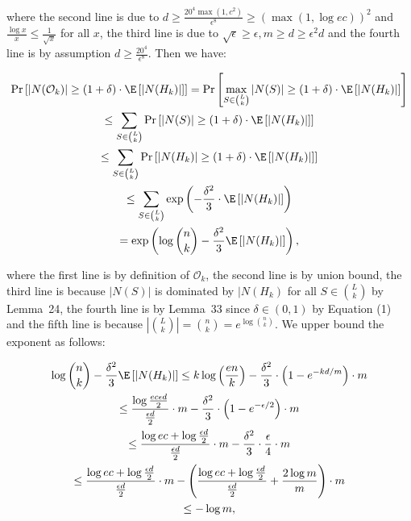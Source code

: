 where the second line is due to $d\geq\frac{20^{4}\max(1,c^{2})}{\epsilon^{8}}\geq(\max(1,\log{ec}))^{2}$ and $\frac{\log{x}}{x}\leq\frac{1}{\sqrt{x}}$ for all $x$, the third line is due to $\sqrt{\epsilon}\geq\epsilon,m\geq d\geq\epsilon^{2}d$ and the fourth line is by assumption $d\geq\frac{20^{4}}{\epsilon^{8}}$.
Then we have:\par


\[\begin{gathered}
\displaystyle\Pr\left[|N(\mathcal{O}_{k})|\geq(1+\delta)\cdot\E\left[|N(H_{k})|\right]\right] \displaystyle=\Pr\left[\max_{S\in\binom{L}{k}}|N(S)|\geq(1+\delta)\cdot\E\left[|N(H_{k})|\right]\right] \\
\displaystyle\leq\sum_{S\in\binom{L}{k}}\Pr\left[|N(S)|\geq(1+\delta)\cdot\E\left[|N(H_{k})|\right]\right] \\
\displaystyle\leq\sum_{S\in\binom{L}{k}}\Pr\left[|N(H_{k})|\geq(1+\delta)\cdot\E\left[|N(H_{k})|\right]\right] \\
\displaystyle\leq\sum_{S\in\binom{L}{k}}\exp\left(-\frac{\delta^{2}}{3}\cdot\E\left[|N(H_{k})|\right]\right) \\
\displaystyle=\exp\left(\log{\binom{n}{k}}-\frac{\delta^{2}}{3}\E\left[|N(H_{k})|\right]\right),
\end{gathered}\]


where the first line is by definition of $\mathcal{O}_{k}$, the second line is by union bound, the third line is because $|N(S)|$ is dominated by $|N(H_{k})$ for all $S\in\binom{L}{k}$ by Lemma 24, the fourth line is by Lemma 33 since $\delta\in(0,1)$ by Equation (1) and the fifth line is because $|\binom{L}{k}|=\binom{n}{k}=e^{\log{\binom{n}{k}}}$.
We upper bound the exponent as follows:\par


\[\begin{gathered}
\displaystyle\log{\binom{n}{k}}-\frac{\delta^{2}}{3}\E\left[|N(H_{k})|\right] \displaystyle\leq k\log\left(\frac{en}{k}\right)-\frac{\delta^{2}}{3}\cdot\left(1-e^{-kd/m}\right)\cdot m \\
\displaystyle\leq\frac{\log{\frac{ec\epsilon d}{2}}}{\frac{\epsilon d}{2}}\cdot m-\frac{\delta^{2}}{3}\cdot\left(1-e^{-\epsilon/2}\right)\cdot m \\
\displaystyle\leq\frac{\log{ec}+\log{\frac{\epsilon d}{2}}}{\frac{\epsilon d}{2}}\cdot m-\frac{\delta^{2}}{3}\cdot\frac{\epsilon}{4}\cdot m \\
\displaystyle\leq\frac{\log{ec}+\log{\frac{\epsilon d}{2}}}{\frac{\epsilon d}{2}}\cdot m-\left(\frac{\log{ec}+\log{\frac{\epsilon d}{2}}}{\frac{\epsilon d}{2}}+\frac{2\log{m}}{m}\right)\cdot m \\
\displaystyle\leq-\log{m},
\end{gathered}\]


